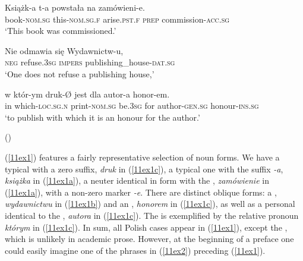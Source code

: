\documentclass[output=paper,colorlinks,citecolor=brown]{langscibook}
\begin{document}
\begin{exe}
	\ex \label{11ex1}
	\begin{xlist}
		\ex \label{11ex1a}
		\gll Książk-a t-a powstała na zamówieni-e. \\
		book-\textsc{nom.sg} this-\textsc{nom.sg.f} arise.\textsc{pst.f} \textsc{prep} commission-\textsc{acc.sg} \\
		\trans ‘This book was commissioned.’
		
		\ex \label{11ex1b}
		\gll Nie odmawia się Wydawnictw-u, \\
		\textsc{neg} refuse.\textsc{3sg} \textsc{impers} publishing\_house-\textsc{dat.sg} \\
		\trans ‘One does not refuse a publishing house,’
		
		\ex \label{11ex1c}
		\gll w któr-ym druk-Ø jest dla autor-a honor-em. \\
		in which-\textsc{loc.sg.n} print-\textsc{nom.sg} be.\textsc{3sg} for author-\textsc{gen.sg} honour-\textsc{ins.sg} \\
		\trans ‘to publish with which it is an honour for the author.’
		
		\hfill (\citealt[9]{nagorko1997})
	\end{xlist}
\end{exe}

(\ref{11ex1}) features a fairly representative selection of noun forms. We have a typical   with a zero suffix, \emph{druk} in (\ref{11ex1c}), a typical  one with the suffix \emph{-a}, \emph{książka} in (\ref{11ex1a}), a neuter  identical in form with the , \emph{zamówienie} in (\ref{11ex1a}), with a non-zero marker \emph{-e}. There are distinct oblique  forms: a , \emph{wydawnictwu} in (\ref{11ex1b}) and an , \emph{honorem} in (\ref{11ex1c}), as well as a  personal  identical to the , \emph{autora} in (\ref{11ex1c}). The  is exemplified by the relative pronoun \emph{którym} in (\ref{11ex1c}). In sum, all Polish cases appear in (\ref{11ex1}), except the , which is unlikely in academic prose. However, at the beginning of a preface one could easily imagine one of the  phrases in (\ref{11ex2}) preceding (\ref{11ex1}).
\end{document}

